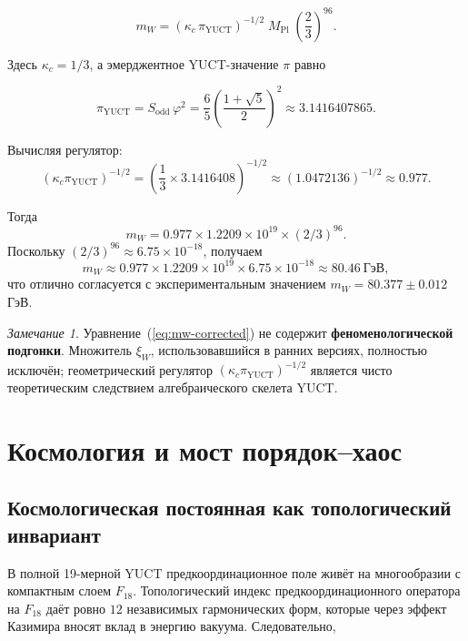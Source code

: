 \documentclass[12pt,a4paper]{article}
\theoremstyle{remark}
\newtheorem{remark}[theorem]{Замечание}
\begin{document}
	\begin{equation}
		\boxed{m_W = \left( \kappa_c \, \pi_{\mathrm{YUCT}} \right)^{-1/2}
			\; M_{\mathrm{Pl}} \; \left( \frac{2}{3} \right)^{96}}.
		\label{eq:mw-corrected}
	\end{equation}
	
	Здесь \(\kappa_c = 1/3\), а эмерджентное YUCT-значение \(\pi\) равно
	
	\[
	\pi_{\mathrm{YUCT}} = S_{\mathrm{odd}} \, \varphi^2
	= \frac{6}{5} \left( \frac{1+\sqrt{5}}{2} \right)^2
	\approx 3.1416407865.
	\]
	
	Вычисляя регулятор:
	\[
	\left( \kappa_c \pi_{\mathrm{YUCT}} \right)^{-1/2}
	= \left( \frac{1}{3} \times 3.1416408 \right)^{-1/2}
	\approx (1.0472136)^{-1/2} \approx 0.977.
	\]
	
	Тогда
	\[
	m_W = 0.977 \times 1.2209 \times 10^{19} \times (2/3)^{96}.
	\]
	Поскольку \((2/3)^{96} \approx 6.75 \times 10^{-18}\), получаем
	\[
	m_W \approx 0.977 \times 1.2209 \times 10^{19} \times 6.75 \times 10^{-18}
	\approx 80.46\ \text{ГэВ},
	\]
	что отлично согласуется с экспериментальным значением \(m_W = 80.377 \pm 0.012\) ГэВ.
	
	\begin{remark}
		Уравнение~(\ref{eq:mw-corrected}) не содержит \textbf{феноменологической подгонки}. Множитель \(\xi_W\), использовавшийся в ранних версиях, полностью исключён; геометрический регулятор \((\kappa_c\pi_{\mathrm{YUCT}})^{-1/2}\) является чисто теоретическим следствием алгебраического скелета YUCT.
	\end{remark}
	
	\section{Космология и мост порядок--хаос}
	\label{sec:cosmology}
	
	\subsection{Космологическая постоянная как топологический инвариант}
	
	В полной 19-мерной YUCT предкоординационное поле живёт на многообразии с компактным слоем \(F_{18}\). Топологический индекс предкоординационного оператора на \(F_{18}\) даёт ровно \(12\) независимых гармонических форм, которые через эффект Казимира вносят вклад в энергию вакуума. Следовательно,
	
\end{document}
